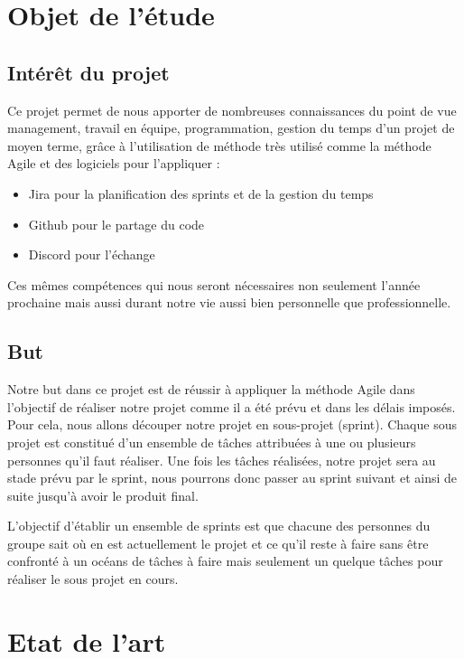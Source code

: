 \documentclass[a4paper,11pt]{article}
\begin{document}
\section{Objet de l’étude}

\subsection{Intérêt du projet}
Ce projet permet de nous apporter de nombreuses connaissances du point de vue management, 
travail en équipe, programmation, gestion du temps d’un projet de moyen terme, 
grâce à l’utilisation de méthode très utilisé comme la méthode Agile et des logiciels pour l’appliquer : \newline

\begin{itemize}
    \item Jira pour la planification des sprints et de la gestion du temps
    \item Github pour le partage du code
    \item Discord pour l’échange
\end{itemize}

\break

Ces mêmes compétences qui nous seront nécessaires non seulement 
l’année prochaine mais aussi durant notre vie aussi bien personnelle que professionnelle.

\subsection{But}

Notre but dans ce projet est de réussir à appliquer la méthode Agile dans l’objectif 
de réaliser notre projet comme il a été prévu et dans les délais imposés.
Pour cela, nous allons découper notre projet en sous-projet (sprint).
Chaque sous projet est constitué d’un ensemble de tâches attribuées à une ou plusieurs 
personnes qu’il faut réaliser. Une fois les tâches réalisées, notre projet sera au stade 
prévu par le sprint, nous pourrons donc passer au sprint suivant et ainsi de suite jusqu’à avoir le produit final.\newline

L'objectif d’établir un ensemble de sprints est que chacune des personnes du groupe sait 
où en est actuellement le projet et ce qu’il reste à faire sans être confronté à un océans de 
tâches à faire mais seulement un quelque tâches pour réaliser le sous projet en cours.


\section{Etat de l’art}
\end{document}
